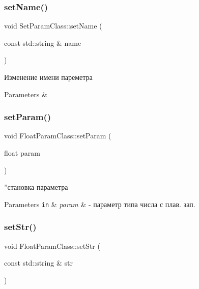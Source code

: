 \subsubsection{\texorpdfstring{set\+Name()}{setName()}}
{\footnotesize\ttfamily void Set\+Param\+Class\+::set\+Name (\begin{DoxyParamCaption}\item[{const std\+::string \&}]{name }\end{DoxyParamCaption})\hspace{0.3cm}{\ttfamily [inherited]}}



Изменение имени пареметра 


\begin{DoxyParams}{Parameters}
{\em } & \\
\hline
\end{DoxyParams}
\mbox{\label{class_float_param_class_a1aa06fb1d73b5272a06c7d4214735a6a}} 
\subsubsection{\texorpdfstring{set\+Param()}{setParam()}}
{\footnotesize\ttfamily void Float\+Param\+Class\+::set\+Param (\begin{DoxyParamCaption}\item[{float}]{param }\end{DoxyParamCaption})}



”становка параметра 


\begin{DoxyParams}[1]{Parameters}
\mbox{\tt in}  & {\em param} & -\/ параметр типа числа с плав. зап. \\
\hline
\end{DoxyParams}
\mbox{\label{class_float_param_class_aa0068fb947c0c97301327bf2dd33392e}} 
\subsubsection{\texorpdfstring{set\+Str()}{setStr()}}
{\footnotesize\ttfamily void Float\+Param\+Class\+::set\+Str (\begin{DoxyParamCaption}\item[{const std\+::string \&}]{str }\end{DoxyParamCaption})\hspace{0.3cm}{\ttfamily [virtual]}}



